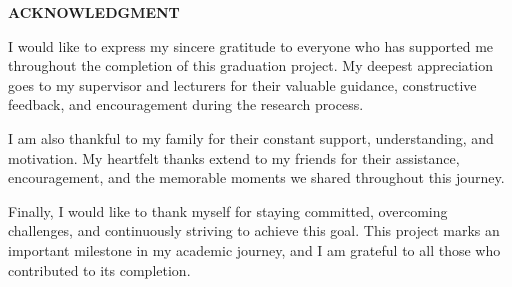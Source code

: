 \documentclass[../main.tex]{subfiles}
\begin{document}
	
	\begin{center}
		\Large{\textbf{ACKNOWLEDGMENT}}
	\end{center}
	
	\vspace{1cm}
	
	I would like to express my sincere gratitude to everyone who has supported me throughout the completion of this graduation project. My deepest appreciation goes to my supervisor and lecturers for their valuable guidance, constructive feedback, and encouragement during the research process.
	
	I am also thankful to my family for their constant support, understanding, and motivation. My heartfelt thanks extend to my friends for their assistance, encouragement, and the memorable moments we shared throughout this journey.
	
	Finally, I would like to thank myself for staying committed, overcoming challenges, and continuously striving to achieve this goal. This project marks an important milestone in my academic journey, and I am grateful to all those who contributed to its completion.
	
\end{document}
